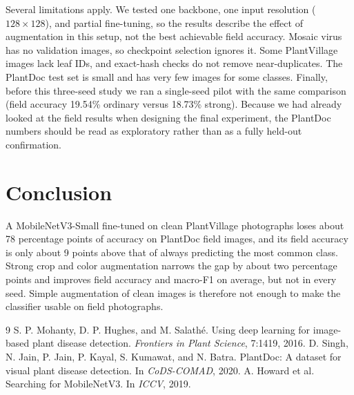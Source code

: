 \documentclass[11pt,letterpaper]{article}
\begin{document}
Several limitations apply. We tested one backbone, one input resolution ($128\times128$), and partial fine-tuning, so the results describe the effect of augmentation in this setup, not the best achievable field accuracy. Mosaic virus has no validation images, so checkpoint selection ignores it. Some PlantVillage images lack leaf IDs, and exact-hash checks do not remove near-duplicates. The PlantDoc test set is small and has very few images for some classes. Finally, before this three-seed study we ran a single-seed pilot with the same comparison (field accuracy 19.54\% ordinary versus 18.73\% strong). Because we had already looked at the field results when designing the final experiment, the PlantDoc numbers should be read as exploratory rather than as a fully held-out confirmation.

\section{Conclusion}
A MobileNetV3-Small fine-tuned on clean PlantVillage photographs loses about 78 percentage points of accuracy on PlantDoc field images, and its field accuracy is only about 9 points above that of always predicting the most common class. Strong crop and color augmentation narrows the gap by about two percentage points and improves field accuracy and macro-F1 on average, but not in every seed. Simple augmentation of clean images is therefore not enough to make the classifier usable on field photographs.

\clearpage
\begin{thebibliography}{9}\small
{} S. P. Mohanty, D. P. Hughes, and M. Salath\'e. Using deep learning for image-based plant disease detection. \emph{Frontiers in Plant Science}, 7:1419, 2016.
 D. Singh, N. Jain, P. Jain, P. Kayal, S. Kumawat, and N. Batra. PlantDoc: A dataset for visual plant disease detection. In \emph{CoDS-COMAD}, 2020.
 A. Howard et al. Searching for MobileNetV3. In \emph{ICCV}, 2019.
\end{thebibliography}
\end{document}
